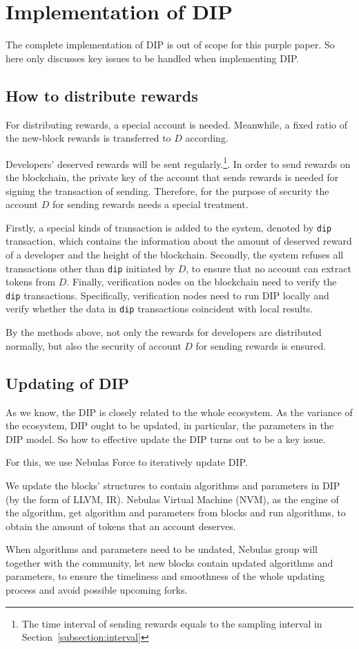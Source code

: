 \section{Implementation of DIP}
The complete implementation of DIP is out of scope for this purple paper. So here only discusses key issues to be handled when implementing DIP\@.

\subsection{How to distribute rewards}
For distributing rewards, a special account is needed. Meanwhile, a fixed ratio of  the new-block rewards is transferred to $D$ according.

Developers' deserved rewards will be sent regularly.\footnote{The time interval of sending rewards equals to the sampling interval in Section~\ref{subsection:interval}}. In order to send rewards on the blockchain, the private key of the account that sends rewards is needed for signing the transaction of sending. Therefore, for the purpose of security the account $D$ for sending rewards needs a special treatment.

Firstly, a special kinds of transaction is added to the system, denoted by \texttt{dip} transaction, which contains the information about the amount of deserved reward of a developer and the height of the blockchain. Secondly, the system refuses all transactions other than \texttt{dip} initiated by $D$, to ensure that no account can extract tokens from $D$. Finally, verification nodes on the blockchain  need to verify the \texttt{dip} transactions. Specifically, verification nodes need to run DIP locally and verify whether the data in \texttt{dip} transactions coincident with local results.

By the methods above, not only the rewards for developers are distributed normally, but also the security of account $D$ for sending rewards is ensured.

\subsection{Updating of DIP}
As we know, the DIP is closely related to the whole ecosystem. As the variance of the ecosystem, DIP ought to be updated, in particular, the parameters in the DIP model. So how to effective update the DIP turns out to be a key issue.

For this, we use Nebulas Force to iteratively update DIP\@.

We update the blocks' structures to contain algorithms and parameters in DIP (by the form of LLVM, IR). Nebulas Virtual Machine (NVM), as the engine of the algorithm, get algorithm and parameters from blocks and run algorithms, to obtain the amount of tokens that an account deserves.

When algorithms and parameters need to be undated, Nebulas group will together with the community, let new blocks contain updated algorithms and parameters, to ensure the timeliness and smoothness of the whole updating process and avoid possible upcoming forks.
